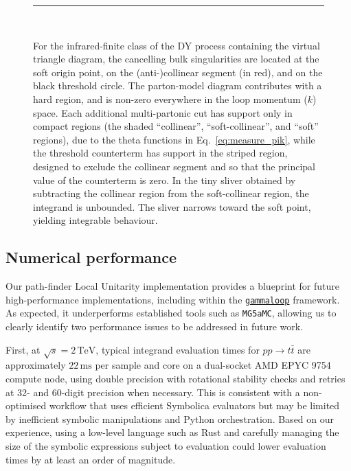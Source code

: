 \documentclass[%
 reprint,
 amsmath,amssymb,
 superscriptaddress,
 aps,
 preprintnumbers,
prl,
floatfix,
]{revtex4-2}
\let\label\latexKernelLabel
\begin{document}
\begin{figure}[!tp]
\scalebox{0.6}{

}
\caption{\justifying For the infrared-finite class of the DY process containing the virtual triangle diagram, the cancelling bulk singularities are located at the soft origin point, on the (anti-)collinear segment (in red), and on the black threshold circle. The parton-model diagram contributes with a hard region, and is non-zero everywhere in the loop momentum ($k$) space. Each additional multi-partonic cut has support only in compact regions (the shaded ``collinear'', ``soft-collinear'', and ``soft'' regions), due to the theta functions in Eq.~\eqref{eq:measure_pik}, while the threshold counterterm has support in the striped region, designed to exclude the collinear segment and so that the principal value of the counterterm is zero.
In the tiny sliver obtained by subtracting the collinear region from the soft-collinear region, the integrand is unbounded. The sliver narrows toward the soft point, yielding integrable behaviour.}
{\color{gray!50}\rule{0.8\linewidth}{0.6pt}}
\phantom{g}\\[-0.3cm]
\label{fig:triangle_region}
\end{figure}

\subsection{Numerical performance}
\label{sec:numerical_performance}


Our path-finder Local Unitarity implementation provides a blueprint for future high-performance implementations, including within the \href{https://github.com/alphal00p/gammaloop}{\texttt{gammaloop}} framework.
As expected, it underperforms established tools such as \texttt{MG5aMC}, allowing us to clearly identify two performance issues to be addressed in future work.

First, at $\sqrt{s}=2\,\mathrm{TeV}$, typical integrand evaluation times for $pp\rightarrow t\bar{t}$ are approximately $22\,\mathrm{ms}$ per sample and core on a dual-socket AMD EPYC 9754 compute node, using double precision with rotational stability checks and retries at 32- and 60-digit precision when necessary. 
This is consistent with a non-optimised workflow that uses efficient Symbolica evaluators but may be limited by inefficient symbolic manipulations and Python orchestration.
Based on our experience, using a low-level language such as Rust and carefully managing the size of the symbolic expressions subject to evaluation could lower evaluation times by at least an order of magnitude.
\end{document}

